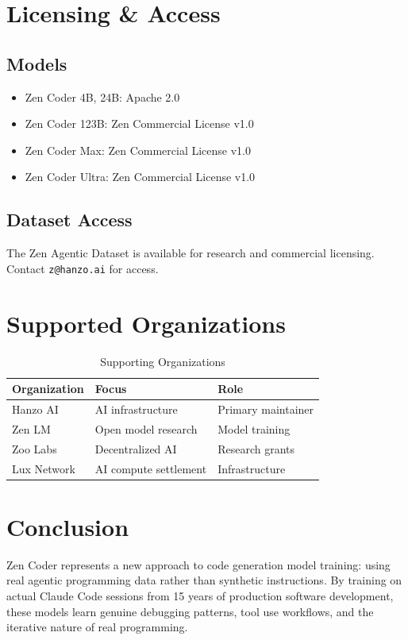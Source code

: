 \documentclass[11pt,a4paper]{article}
\begin{document}
\section{Licensing \& Access}

\subsection{Models}
\begin{itemize}
    \item Zen Coder 4B, 24B: Apache 2.0
    \item Zen Coder 123B: Zen Commercial License v1.0
    \item Zen Coder Max: Zen Commercial License v1.0
    \item Zen Coder Ultra: Zen Commercial License v1.0
\end{itemize}

\subsection{Dataset Access}
The Zen Agentic Dataset is available for research and commercial licensing.
Contact \texttt{z@hanzo.ai} for access.

\section{Supported Organizations}

\begin{table}[H]
\centering
\begin{tabular}{lll}
\toprule
\textbf{Organization} & \textbf{Focus} & \textbf{Role} \\
\midrule
Hanzo AI & AI infrastructure & Primary maintainer \\
Zen LM & Open model research & Model training \\
Zoo Labs & Decentralized AI & Research grants \\
Lux Network & AI compute settlement & Infrastructure \\
\bottomrule
\end{tabular}
\caption{Supporting Organizations}
\end{table}

\section{Conclusion}

Zen Coder represents a new approach to code generation model training: using real agentic programming
data rather than synthetic instructions. By training on actual Claude Code sessions from 15 years of
production software development, these models learn genuine debugging patterns, tool use workflows,
and the iterative nature of real programming.
\end{document}
